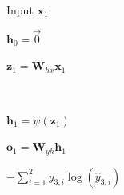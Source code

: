 \documentclass[11pt,addpoints,answers]{exam}
\newcommand{\hv}{\mathbf{h}}
\newcommand{\ov}{\mathbf{o}}
\newcommand{\xv}{\mathbf{x}}
\newcommand{\zv}{\mathbf{z}}
\newcommand{\Wv}{\mathbf{W}}
\begin{document}
\begin{questions}
\begin{parts}
\begin{subparts}
    \begin{your_solution}[title=(a),height=2cm,width=4.8cm]
    Input $\xv_1$
    \end{your_solution}
     \begin{your_solution}[title=(b),height=2cm,width=4.8cm]
    $\hv_0 = \vec{0}$
    \end{your_solution}
     \begin{your_solution}[title=(c),height=2cm,width=4.8cm]
    $\zv_1 = \Wv_{hx}\xv_1$
    \end{your_solution}\\
     \begin{your_solution}[title=(d),height=2cm,width=4.8cm]
    $\hv_1 = \psi(\zv_1)$
    \end{your_solution}
     \begin{your_solution}[title=(e),height=2cm,width=4.8cm]
    $\ov_1 = \Wv_{yh}\hv_1$
    \end{your_solution}
     \begin{your_solution}[title=(f),height=2cm,width=4.8cm]
    $-\sum_{i=1}^2 y_{3,i}\log(\hat{y}_{3,i})$
    \end{your_solution}
    
    

    
    
    

\end{subparts}
\end{parts}
\end{questions}
\end{document}
